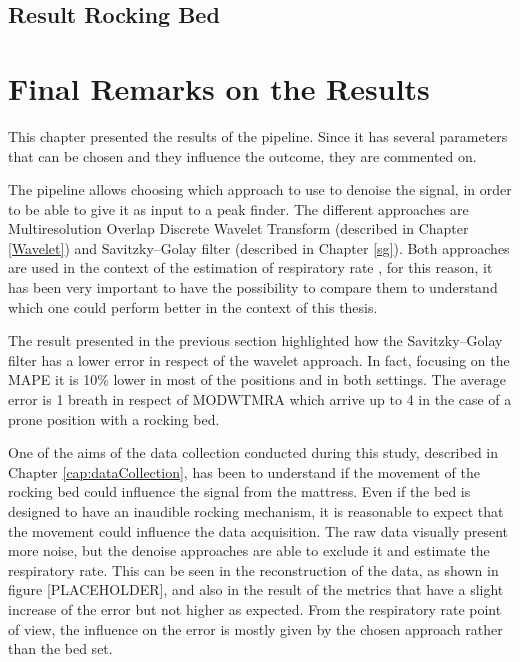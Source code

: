 \subsection{Result Rocking Bed}   \label{cap:ResultRockingBed1}


\section{Final Remarks on the Results}

This chapter presented the results of the pipeline. Since it has several parameters that can be chosen and they influence the outcome, they are commented on.

The pipeline allows choosing which approach to use to denoise the signal, in order to be able to give it as input to a peak finder. The different approaches are Multiresolution Overlap Discrete Wavelet Transform (described in Chapter \ref{Wavelet}) and Savitzky–Golay filter (described in Chapter \ref{sg}).
Both approaches are used in the context of the estimation of respiratory rate \cite{Sadek2017NonintrusiveStudy, Chen2008UnconstrainedSleep}, for this reason, it has been very important to have the possibility to compare them to understand which one could perform better in the context of this thesis.

The result presented in the previous section highlighted how the Savitzky–Golay filter has a lower error in respect of the wavelet approach. In fact, focusing on the MAPE it is 10\% lower in most of the positions and in both settings. The average error is 1 breath in respect of MODWTMRA which arrive up to 4 in the case of a prone position with a rocking bed.



One of the aims of the data collection conducted during this study, described in Chapter \ref{cap:dataCollection}, has been to understand if the movement of the rocking bed could influence the signal from the mattress.
Even if the bed is designed to have an inaudible rocking mechanism, it is reasonable to expect that the movement could influence the data acquisition. The raw data visually present more noise, but the denoise approaches are able to exclude it and estimate the respiratory rate.
This can be seen in the reconstruction of the data, as shown in figure [PLACEHOLDER], and also in the result of the metrics that have a slight increase of the error but not higher as expected.
From the respiratory rate point of view, the influence on the error is mostly given by the chosen approach rather than the bed set. 

